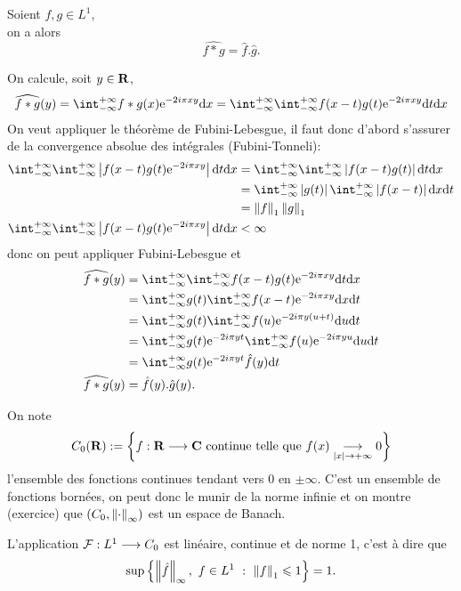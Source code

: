 \documentclass[a4paper,11pt, twoside]{article}
\begin{document}
\begin{prop}
  Soient $f,g\in L^1$,\\

  on a alors 
  $$\widehat{f*g}=\hat f.\hat g.$$
\end{prop}


\begin{Proof}
  On calcule, soit $y\in\mathbf R$,
  $$\widehat{f*g}(y)=\intr f*g(x)\ex{-2i\pi xy}\dx=\intr\intr f(x-t)g(t)\ex{-2i\pi xy}\dt\dx$$
  On veut appliquer le théorème de Fubini-Lebesgue, il faut donc d'abord s'assurer de la convergence absolue des intégrales (Fubini-Tonneli): 
  \begin{align*}
    \intr\intr \abs{f(x-t)g(t)\ex{-2i\pi xy}}\dt\dx&=\intr\intr\abs{f(x-t)g(t)}\dt\dx\\
    &=\intr\abs{g(t)}\intr\abs{f(x-t)}\dx\dt\\
    &=\norm{f}_1\norm{g}_1\\
    \intr\intr \abs{f(x-t)g(t)\ex{-2i\pi xy}}\dt\dx&<\infty
  \end{align*}
  donc on peut appliquer Fubini-Lebesgue et 
  \begin{align*}
    \widehat{f*g}(y)&=\intr\intr f(x-t)g(t)\ex{-2i\pi xy}\dt\dx\\
    &=\intr g(t)\intr f(x-t)\ex{-2i\pi xy}\dx\dt\\
    &=\intr g(t)\intr f(u)\ex{-2i\pi y(u+t)}\du\dt\\
    &=\intr g(t)\ex{-2i\pi yt}\intr f(u)\ex{-2i\pi yu}\du\dt\\
    &=\intr g(t)\ex{-2i\pi yt}\hat f(y)\dt\\
    \widehat{f*g}(y)&=\hat f(y).\hat g(y).
  \end{align*}
\end{Proof}


On note 
$$C_0(\mathbf R):=\left\{f:\mathbf R\longrightarrow\mathbf C\text{ continue telle que }f(x)\underset{\left| x\right|\to+\infty}{\longrightarrow}0\right\}$$
l'ensemble des fonctions continues tendant vers $0$ en $\pm\infty$. C'est un ensemble de fonctions bornées, on peut donc le munir de la norme infinie et on montre (exercice) que $\left(C_0,\left\lVert\cdot\right\rVert_\infty\right)$ est un espace de Banach.


\begin{Th}
  L'application $\mathcal F:L^1\longrightarrow C_0$ est linéaire, continue et de norme 1, c'est à dire que 
  $$\mathrm{sup}\ens{\norm{\hat f}_\infty,\ f\in L^1\ :\ \norm{f}_1\leqslant 1}=1.$$
\end{Th}
\end{document}
